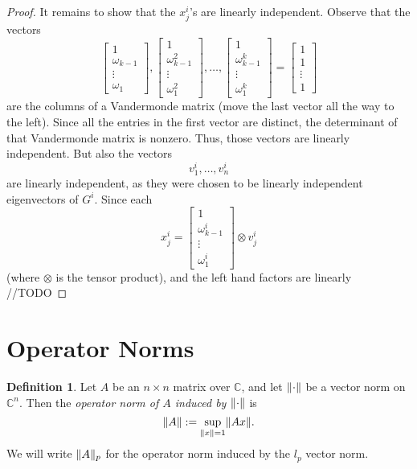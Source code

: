 \documentclass[12pt]{article}
\theoremstyle{definition}
\newtheorem{defn}[thm]{Definition}
\newcommand{\C}{\mathbb C}
\DeclarePairedDelimiter\norm{\lVert}{\rVert}
\begin{document}
\begin{proof}
It remains to show that the $x_j^i$'s are linearly independent. Observe that the vectors 
$$
\begin{bmatrix}
           1 \\
           \omega_{k-1} \\
           \vdots \\
           \omega_{1}
         \end{bmatrix},
\begin{bmatrix}
           1 \\
           \omega_{k-1}^2 \\
           \vdots \\
           \omega_{1}^2
         \end{bmatrix},       
\dots,
\begin{bmatrix}
           1 \\
           \omega_{k-1}^k \\
           \vdots \\
           \omega_{1}^k
         \end{bmatrix}
=
\begin{bmatrix}
           1 \\
           1 \\
           \vdots \\
           1
         \end{bmatrix}
$$
are the columns of a Vandermonde matrix (move the last vector all the way to the left). Since all the entries in the first vector are distinct, the determinant of that Vandermonde matrix is nonzero. Thus, those vectors are linearly independent. But also the vectors $$v^i_1, \dots, v^i_n$$ are linearly independent, as they were chosen to be linearly independent eigenvectors of $G^i$. Since each 
$$
x_j^i = 
\begin{bmatrix}
           1 \\
           \omega_{k-1}^i \\
           \vdots \\
           \omega_{1}^i
         \end{bmatrix}
\otimes v^i_j
$$
(where $\otimes$ is the tensor product), and the left hand factors are linearly  //TODO
\end{proof}

\section{Operator Norms}

\begin{defn}\label{defn operator norm}
Let $A$ be an $n \times n$ matrix over $\C$, and let $\norm{\cdot}$ be a vector norm on $\C^n$. Then the \textit{operator norm of $A$ induced by $\norm{\cdot}$} is
$$\norm{A} := \sup_{\substack{\norm{x} = 1}} \norm{A x}.$$
We will write $\norm{A}_p$ for the operator norm induced by the $l_p$ vector norm.
\end{defn}
\end{document}
